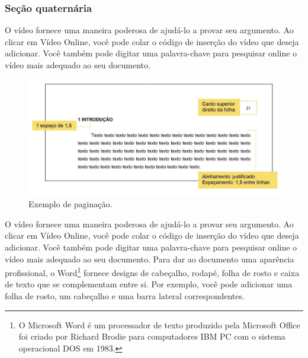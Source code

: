 \subsubsection{Seção quaternária}

O vídeo fornece uma maneira poderosa de ajudá-lo a provar seu argumento. Ao clicar em Vídeo Online, você pode colar o código de inserção do vídeo que deseja adicionar. Você também pode digitar uma palavra-chave para pesquisar online o vídeo mais adequado ao seu documento. 


\begin{figure}
	\centering
	\caption{Exemplo de paginação.}
	\includegraphics[scale=1]{Textuais/Picture1.png}
\end{figure}





O vídeo fornece uma maneira poderosa de ajudá-lo a provar seu argumento. Ao clicar em Vídeo Online, você pode colar o código de inserção do vídeo que deseja adicionar. Você também pode digitar uma palavra-chave para pesquisar online o vídeo mais adequado ao seu documento. Para dar ao documento uma aparência profissional, o Word\footnote{O Microsoft Word é um processador de texto produzido pela Microsoft Office foi criado por Richard Brodie para computadores IBM PC com o sistema operacional DOS em 1983.} fornece designs de cabeçalho, rodapé, folha de rosto e caixa de texto que se complementam entre si. Por exemplo, você pode adicionar uma folha de rosto, um cabeçalho e uma barra lateral correspondentes.

